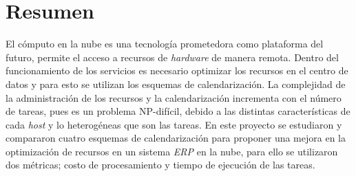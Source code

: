 \chapter*{Resumen}



El c\'omputo en la nube es una tecnolog\'ia prometedora como plataforma del futuro, permite el acceso a recursos de  \textit{hardware} de manera remota. Dentro del funcionamiento de los servicios es necesario optimizar los recursos en el centro de datos y para esto se utilizan los esquemas de calendarizaci\'on. La complejidad de la administraci\'on de los recursos y la calendarizaci\'on incrementa con el n\'umero de tareas, pues es un problema NP-dif\'icil, debido a las distintas caracter\'isticas de cada \textit{host} y lo heterog\'eneas que son las tareas.
En este proyecto se estudiaron y compararon cuatro esquemas de calendarizaci\'on para proponer una mejora en la optimizaci\'on de recursos en un sistema \textit{ERP} en la nube, para ello se utilizaron dos m\'etricas; costo de procesamiento y tiempo de ejecuci\'on de las tareas.



